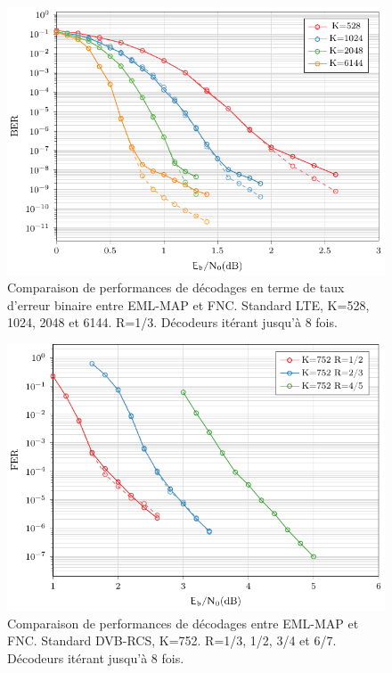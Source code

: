 \begin{figure}[!t]
	\centering
	\includegraphics[width=\textwidth]{main/ch3_fig/fnc/lte/tikz/lte_ber.pdf}
	\caption{Comparaison de performances de décodages en terme de taux d'erreur binaire entre EML-MAP et FNC. Standard LTE, K=528, 1024, 2048 et 6144. R=1/3.
	Décodeurs itérant jusqu'à 8 fois. \label{fig:fnc_lte_ber}}
\end{figure}

\begin{figure}[!t]
	\centering
	\includegraphics[width=\textwidth, draft]{main/ch3_fig/fnc/dvb/tikz/dvb1_752.pdf}
	\caption{Comparaison de performances de décodages entre EML-MAP et FNC. Standard DVB-RCS, K=752. R=1/3, 1/2, 3/4 et 6/7.
	Décodeurs itérant jusqu'à 8 fois. \label{fig:fnc_dvb_752}}
\end{figure}